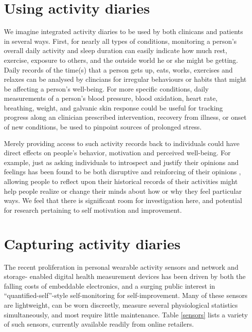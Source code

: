 \documentclass{chi-ext}
\begin{document}
\section{Using activity diaries}

We imagine integrated activity diaries to be used by both clinicans
and patients in several ways.  First, for nearly all types of
conditions, monitoring a person's overall daily activity and sleep
duration can easily indicate how much rest, exercise, exposure to
others, and the outside world he or she might be getting.  Daily
records of the time(s) that a person gets up, eats, works, exercises
and relaxes can be analysed by clincians for irregular behaviours or
habits that might be affecting a person's well-being. For more
specific conditions, daily measurements of a person's blood pressure,
blood oxidation, heart rate, breathing, weight, and galvanic skin
response could be useful for tracking progress along an clinician
prescribed intervention, recovery from illness, or onset of new
conditions, be used to pinpoint sources of prolonged stress.

Merely providing access to such activity records back to individuals
could have direct effects on people's behavior, motivation and
perceived well-being.  For example, just as asking individuals to
introspect and justify their opinions and feelings has been found to
be both disruptive and reinforcing of their opinions
\cite{wilson1989introspection}, allowing people to reflect upon their
historical records of their activities might help people realize or
change their minds about how or why they feel particular ways. We feel
that there is significant room for investigation here, and potential
for research pertaining to self motivation and improvement.

\section{Capturing activity diaries}

The recent proliferation in personal wearable activity sensors and
network and storage- enabled digital health measurement devices has
been driven by both the falling costs of embeddable electronics, and a
surging public interest in ``quantified-self''-style self-monitoring
for self-improvement.  Many of these sensors are lightweight, can be
worn discreetly, measure several physiological statistics
simultaneously, and most require little maintenance. Table
\ref{sensors} lists a variety of such sensors, currently available
readily from online retailers.
\end{document}
